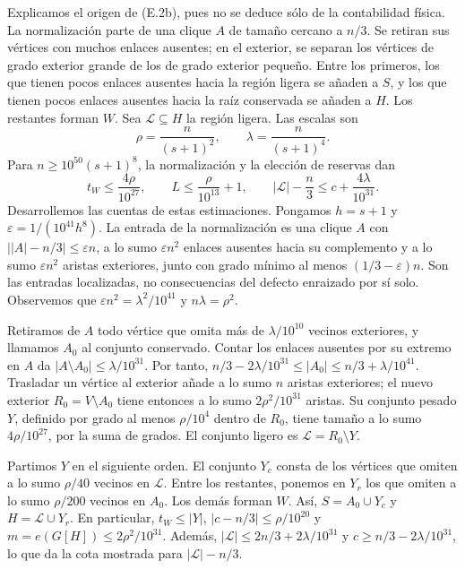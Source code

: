 \documentclass[spanish,11pt,a4paper]{article}
\begin{document}
Explicamos el origen de (E.2b), pues no se deduce sólo de la contabilidad física. La normalización parte de una clique \(A\) de tamaño cercano a \(n/3\). Se retiran sus vértices con muchos enlaces ausentes; en el exterior, se separan los vértices de grado exterior grande de los de grado exterior pequeño. Entre los primeros, los que tienen pocos enlaces ausentes hacia la región ligera se añaden a \(S\), y los que tienen pocos enlaces ausentes hacia la raíz conservada se añaden a \(H\). Los restantes forman \(W\). Sea \(\mathcal L\subseteq H\) la región ligera. Las escalas son \[
\rho=\frac{n}{(s+1)^2},\qquad \lambda=\frac{n}{(s+1)^4}.
\] Para \(n\ge10^{50}(s+1)^8\), la normalización y la elección de reservas dan \[
t_W\le\frac{4\rho}{10^{27}},\qquad
L\le\frac{\rho}{10^{13}}+1,\qquad
|\mathcal L|-\frac n3\le c+\frac{4\lambda}{10^{31}}.
\] Desarrollemos las cuentas de estas estimaciones. Pongamos \(h=s+1\) y \(\varepsilon=1/(10^{41}h^8)\). La entrada de la normalización es una clique \(A\) con \(\bigl||A|-n/3\bigr|\le\varepsilon n\), a lo sumo \(\varepsilon n^2\) enlaces ausentes hacia su complemento y a lo sumo \(\varepsilon n^2\) aristas exteriores, junto con grado mínimo al menos \((1/3-\varepsilon)n\). Son las entradas localizadas, no consecuencias del defecto enraizado por sí solo. Observemos que \(\varepsilon n^2=\lambda^2/10^{41}\) y \(n\lambda=\rho^2\).

Retiramos de \(A\) todo vértice que omita más de \(\lambda/10^{10}\) vecinos exteriores, y llamamos \(A_0\) al conjunto conservado. Contar los enlaces ausentes por su extremo en \(A\) da \(|A\setminus A_0|\le\lambda/10^{31}\). Por tanto, \(n/3-2\lambda/10^{31}\le|A_0|\le n/3+\lambda/10^{41}\). Trasladar un vértice al exterior añade a lo sumo \(n\) aristas exteriores; el nuevo exterior \(R_0=V\setminus A_0\) tiene entonces a lo sumo \(2\rho^2/10^{31}\) aristas. Su conjunto pesado \(Y\), definido por grado al menos \(\rho/10^4\) dentro de \(R_0\), tiene tamaño a lo sumo \(4\rho/10^{27}\), por la suma de grados. El conjunto ligero es \(\mathcal L=R_0\setminus Y\).

Partimos \(Y\) en el siguiente orden. El conjunto \(Y_c\) consta de los vértices que omiten a lo sumo \(\rho/40\) vecinos en \(\mathcal L\). Entre los restantes, ponemos en \(Y_r\) los que omiten a lo sumo \(\rho/200\) vecinos en \(A_0\). Los demás forman \(W\). Así, \(S=A_0\cup Y_c\) y \(H=\mathcal L\cup Y_r\). En particular, \(t_W\le|Y|\), \(|c-n/3|\le\rho/10^{20}\) y \(m=e(G[H])\le2\rho^2/10^{31}\). Además, \(|\mathcal L|\le2n/3+2\lambda/10^{31}\) y \(c\ge n/3-2\lambda/10^{31}\), lo que da la cota mostrada para \(|\mathcal L|-n/3\).
\end{document}
